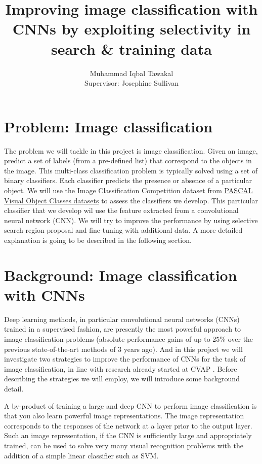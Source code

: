 \documentclass[a4paper]{article}
\title{Improving image classification with CNNs by exploiting
  selectivity in search \& training data}
\author{Muhammad Iqbal Tawakal\\
 Supervisor: Josephine Sullivan}
\date{}
\begin{document}
\maketitle


\section{Problem: Image classification}

The problem we will tackle in this project is image
classification. Given an image, predict a set of labels (from a
pre-defined list) that correspond to the objects in the image. This
multi-class classification problem is typically solved using a set of
binary classifiers. Each classifier predicts the presence or absence
of a particular object. We will use the Image Classification
Competition dataset from
\href{http://pascallin.ecs.soton.ac.uk/challenges/VOC/}{PASCAL Visual
  Object Classes datasets} to assess the classifiers we develop.
This particular classifier that we develop wil use the feature extracted 
from a convolutional neural network (CNN). We will try to improve the performance 
by using selective search region proposal and fine-tuning with additional data.
A more detailed explanation is going to be described in the following section.


\section{Background: Image classification with CNNs}

Deep learning methods, in particular convolutional neural networks
(CNNs)\cite{LeCun:ieee:98} trained in a supervised fashion, are
presently the most powerful approach to image classification problems
\cite{Krizhevsky:nips:12} (absolute performance gains of up to 25\%
over the previous state-of-the-art methods of 3 years ago). And in
this project we will investigate two strategies to improve the
performance of CNNs for the task of image classification, in line with
research already started at CVAP
\cite{Razavian:arxiv:14,Hossein:arxiv:14}. Before describing the
strategies we will employ, we will introduce some background detail.

A by-product of training a large and deep CNN to perform image
classification is that you also learn powerful image
representations. The image representation corresponds to the responses
of the network at a layer prior to the output layer. Such an image
representation, if the CNN is sufficiently large and appropriately
trained, can be used to solve very many visual recognition problems
\cite{Razavian:arxiv:14} with the addition of a simple linear
classifier such as SVM.
\end{document}
